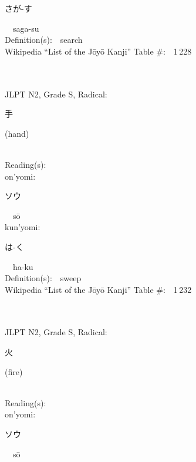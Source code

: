 \begin{multicols}{2}
{\hspace*{2em}}{\begin{CJK}{UTF8}{min} さが-す \end{CJK}}\ \ saga-su\ \ \\
Definition(s):\ \ search \\
Wikipedia ``List of the J\=oy\=o Kanji'' Table \#:\ \ 1\,228 \\
\ \ \\
{\fontsize{34pt}{40pt}  }\ \ \\  %
{JLPT N2, Grade S, Radical:\ \ {\begin{CJK}{UTF8}{min} 手 \end{CJK}} (hand) } \\
Reading(s):\ \ \\
{\hspace*{1em}}on'yomi:\ \ \\
{\hspace*{2em}}{\begin{CJK}{UTF8}{min} ソウ \end{CJK}}\ \ s\=o\ \ \\
{\hspace*{1em}}kun'yomi:\ \ \\
{\hspace*{2em}}{\begin{CJK}{UTF8}{min} は-く \end{CJK}}\ \ ha-ku\ \ \\
Definition(s):\ \ sweep \\
Wikipedia ``List of the J\=oy\=o Kanji'' Table \#:\ \ 1\,232 \\
\ \ \\
{\fontsize{34pt}{40pt}  }\ \ \\  %
{JLPT N2, Grade S, Radical:\ \ {\begin{CJK}{UTF8}{min} 火 \end{CJK}} (fire) } \\
Reading(s):\ \ \\
{\hspace*{1em}}on'yomi:\ \ \\
{\hspace*{2em}}{\begin{CJK}{UTF8}{min} ソウ \end{CJK}}\ \ s\=o\ \ \\

\end{multicols}
